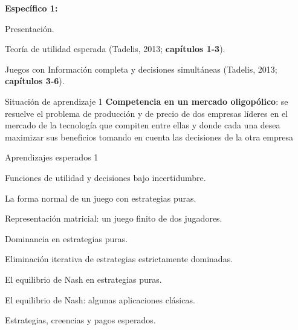 \documentclass[11pt]{article}
\newenvironment{tight_enumerate}{
	\begin{enumerate}
		\setlength{\itemsep}{0pt}
		\setlength{\parskip}{0pt}
	}{\end{enumerate}}
\begin{document}
\begin{tcolorbox}[colback=bluerow!60]
	\textbf{Específico 1: }
		\begin{tight_enumerate}
			\item Presentación.
			\item Teoría de utilidad esperada (Tadelis, 2013;\textbf{ capítulos 1-3}).
			\item Juegos con Información completa y decisiones simultáneas (Tadelis, 2013;\textbf{ capítulos 3-6}).
		\end{tight_enumerate}
	\begin{mybox}[colback=redrow!80]{Situación de aprendizaje 1}
		 \textbf{Competencia en un mercado oligopólico}: se resuelve el problema de producción y de precio de dos empresas líderes en el mercado de la tecnología que compiten entre ellas y donde cada una desea maximizar sus beneficios tomando en cuenta las decisiones de la otra empresa
	\end{mybox}

	\begin{mybox}[colback=purplerow!80]{Aprendizajes esperados 1}
		\begin{tight_enumerate}
			\item Funciones de utilidad y decisiones bajo incertidumbre.
			\item La forma normal de un juego con estrategias puras. 
			\item Representación matricial: un juego finito de dos jugadores. 
			\item Dominancia en estrategias puras. 
			\item Eliminación iterativa de estrategias estrictamente dominadas. 
			\item El equilibrio de Nash en estrategias puras. 
			\item El equilibrio de Nash: algunas aplicaciones clásicas. 
			\item Estrategias, creencias y pagos esperados.
		\end{tight_enumerate}
	\end{mybox}
\end{tcolorbox}

\vspace*{1em}
\end{document}
